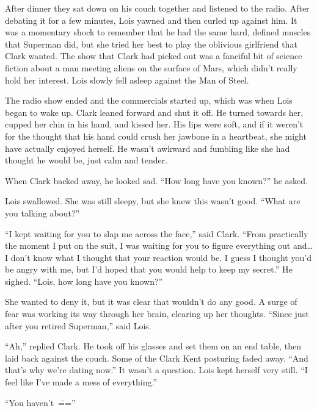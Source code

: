 \documentclass[ebook,12pt]{memoir}
\begin{document}
After dinner they sat down on his couch together and listened to the
radio. After debating it for a few minutes, Lois yawned and then curled
up against him. It was a momentary shock to remember that he had the
same hard, defined muscles that Superman did, but she tried her best to
play the oblivious girlfriend that Clark wanted. The show that Clark had
picked out was a fanciful bit of science fiction about a man meeting
aliens on the surface of Mars, which didn't really hold her interest.
Lois slowly fell asleep against the Man of Steel.

The radio show ended and the commercials started up, which was when Lois
began to wake up. Clark leaned forward and shut it off. He turned
towards her, cupped her chin in his hand, and kissed her. His lips were
soft, and if it weren't for the thought that his hand could crush her
jawbone in a heartbeat, she might have actually enjoyed herself. He
wasn't awkward and fumbling like she had thought he would be, just calm
and tender.

When Clark backed away, he looked sad. ``How long have you known?'' he
asked.

Lois swallowed. She was still sleepy, but she knew this wasn't good.
``What are you talking about?''

``I kept waiting for you to slap me across the face,'' said Clark.
``From practically the moment I put on the suit, I was waiting for you
to figure everything out and\ldots{} I don't know what I thought that
your reaction would be. I guess I thought you'd be angry with me, but
I'd hoped that you would help to keep my secret.'' He sighed. ``Lois,
how long have you known?''

She wanted to deny it, but it was clear that wouldn't do any good. A
surge of fear was working its way through her brain, clearing up her
thoughts. ``Since just after you retired Superman,'' said Lois.

``Ah,'' replied Clark. He took off his glasses and set them on an end
table, then laid back against the couch. Some of the Clark Kent
posturing faded away. ``And that's why we're dating now.'' It wasn't a
question. Lois kept herself very still. ``I feel like I've made a mess
of everything.''

``You haven't~\===''
\end{document}

